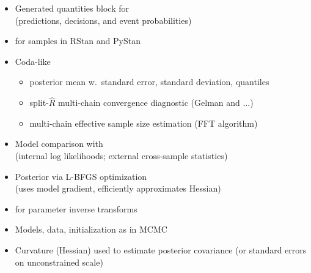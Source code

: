 \documentclass[10pt]{report}
\newcommand{\sld}[1]{\newpage{\noindent\LARGE \ \ \
    \textcolor{MidnightBlue}{\bfseries #1}}\vspace*{4pt}}
\newcommand{\myemph}[1]{{\color{MidnightBlue}{\bfseries #1}}}
\begin{document}
\sld{Posterior Inference}

\begin{itemize}
\item Generated quantities block for \myemph{inference}
\\ {\footnotesize (predictions, decisions, and event probabilities)}
\item \myemph{Extractors} for samples in RStan and PyStan
\item Coda-like \myemph{posterior summary}
\vspace*{-4pt}
\begin{itemize}\small
\item posterior mean w.\ standard error, standard deviation, quantiles
\item split-$\hat{R}$ multi-chain convergence diagnostic (Gelman and ...)
\item multi-chain effective sample size estimation (FFT algorithm)
\end{itemize}
\item Model comparison with \myemph{WAIC}
\\
{\footnotesize (internal log likelihoods; external cross-sample statistics)}
\end{itemize}

\sld{Penalized MLE}

\begin{itemize}
\item Posterior \myemph{mode finding} via L-BFGS optimization
\\ {\footnotesize (uses model gradient, efficiently approximates Hessian)}
\item \myemph{Disables Jacobians} for parameter inverse transforms
\item Models, data, initialization as in MCMC
\item Curvature (Hessian) used to estimate posterior covariance (or
  standard errors on unconstrained scale)
\end{itemize}

\sld{Stan as a Research Tool}
\end{document}
